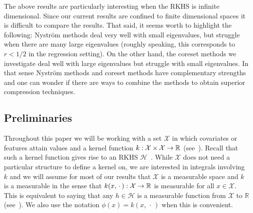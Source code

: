 \documentclass[10pt]{amsart}
\theoremstyle{definition}\newtheorem{defi}[theo]{Definition}\newtheorem{rema}[theo]{Remark}\newtheorem{exam}[theo]{Example}\newtheorem{exem}[theo]{Example}\newtheorem{nota}[theo]{Notation}
\theoremstyle{remark}
\newcommand{\R}{\mathbb{R}}
\newcommand{\X}{\mathcal{X}}
\newcommand{\cH}{\mathcal{H}}
\renewcommand*{\to}{\mathchoice{\longrightarrow}{\rightarrow}{\rightarrow}{\rightarrow}}
\begin{document}
The above results are particularly interesting when the RKHS is infinite dimensional. Since our current results are confined to finite dimensional spaces it is difficult to compare the results. That said, it seems worth to highlight the following: Nystr\"om methods deal very well with small eigenvalues, but struggle when there are many large eigenvalues (roughly speaking, this corresponds to $r<1/2$ in the regression setting). On the other hand, the coreset methods we investigate deal well with large eigenvalues but struggle with small eigenvalues. In that sense Nystr\"om methods and coreset methods have complementary strengths and one can wonder if there are ways to combine the methods to obtain superior compression techniques.


\subsection{Preliminaries} \label{sec:prelim}
Throughout this paper we will be working with a set $\X$ in which covariates or features attain values and a kernel function $k:\X \times \X \to
\R$ (see~\cite[Definition~2.12]{PAUL16}). Recall that such a kernel function gives rise to an RKHS $\cH$~\cite[Definition~2.14]{PAUL16}. While $\X$ does not need a particular structure to define a kernel on, we are interested in integrals involving $k$ and we will assume for most of our results that $\X$ is a measurable space and $k$ is a measurable in the sense that $k(x,\,\cdot\,): \X
\to \R$ is measurable for all $x\in \X$. This is equivalent to saying that any $h \in \cH$ is a measurable function from $\X$ to $\R$ (see~\cite[Lemma~4.24]{STEIN08}). We also use the notation $\phi(x) = k(x,\,\cdot\,)$ when this is convenient.
\end{document}
